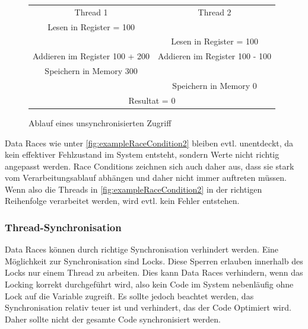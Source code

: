 \documentclass[10pt,a4paper]{article}
\begin{document}
\begin{figure}[H]
\centering
\begin{tabular}{|cc|}
\hline
Thread 1 & Thread 2\\
Lesen in Register = 100 & \\
& Lesen in Register = 100\\
Addieren im Register 100 + 200 & Addieren im Register 100 - 100\\
Speichern in Memory 300 &\\
& Speichern in Memory 0\\
\multicolumn{2}{|c|}{Resultat = 0}\\
\hline
\end{tabular}
\caption[Race Condition]{Ablauf eines unsynchronisierten Zugriff}
\label{fig:exampleRaceCondition2}
\end{figure}
Data Races wie unter \autoref{fig:exampleRaceCondition2} bleiben evtl. unentdeckt, da kein effektiver Fehlzustand im System entsteht, sondern Werte nicht richtig angepasst werden. Race Conditions zeichnen sich auch daher aus, dass sie stark vom Verarbeitungsablauf abhängen und daher nicht immer auftreten müssen. Wenn also die Threads in \autoref{fig:exampleRaceCondition2} in der richtigen Reihenfolge verarbeitet werden, wird evtl. kein Fehler entstehen.\\[0.4cm]
\subsubsection*{Thread-Synchronisation}
Data Races können durch richtige Synchronisation verhindert werden. Eine Möglichkeit zur Synchronisation sind Locks. Diese Sperren erlauben innerhalb des Locks nur einem Thread zu arbeiten. Dies kann Data Races verhindern, wenn das Locking korrekt durchgeführt wird, also kein Code im System nebenläufig ohne Lock auf die Variable zugreift. Es sollte jedoch beachtet werden, das Synchronisation relativ teuer ist und verhindert, das der Code Optimiert wird. Daher sollte nicht der gesamte Code synchronisiert werden.
\newpage
\end{document}
